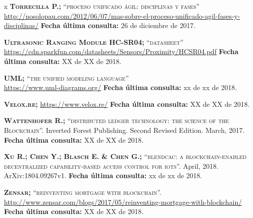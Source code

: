 \begin{thebibliography} {x}
	 \textsc{\textbf{Torrecilla P.; }}\textsc{“proceso unificado ágil: disciplinas y fases”} \\ 
	\url{http://nosolopau.com/2012/06/07/mas-sobre-el-proceso-unificado-agil-fases-y-disciplinas/}
	\newline \textbf{Fecha última consulta:} 26 de diciembre de 2017.
		
	 \textsc{\textbf{Ultrasonic Ranging Module HC-SR04; }}\textsc{“datasheet”} \\
	\url{https://cdn.sparkfun.com/datasheets/Sensors/Proximity/HCSR04.pdf}
	\newline \textbf{Fecha última consulta:} XX de XX de 2018.
				
	 \textsc{\textbf{UML; }}\textsc{“the unified modeling language”} \\ 
	\url{https://www.uml-diagrams.org/}
	\newline \textbf{Fecha última consulta:} xx de xx de 2018.	
		
	 \textsc{\textbf{Velox.re; }} 
	\url{https://www.velox.re/}
	\newline \textbf{Fecha última consulta:} XX de XX de 2018.
	
	 \textsc{\textbf{Wattenhofer R.; }}\textsc{“distributed ledger technology: the science of the Blockchain”.} Inverted Forest Publishing. Second Revised Edition. March, 2017.
	\newline \textbf{Fecha última consulta:} XX de XX de 2018.
	
	 \textsc{\textbf{Xu R.; Chen Y.; Blasch E. \& Chen G.; }} \textsc{“blendcac: a blockchain-enabled decentralized capability-based access control for iots”.} April, 2018. ArXiv:1804.09267v1.
	\newline \textbf{Fecha última consulta:} xx de xx de 2018.
	
	 \textsc{\textbf{Zensar; }} \textsc{“reinventing mortgage with blockchain”.}
	\url{http://www.zensar.com/blogs/2017/05/reinventing-mortgage-with-blockchain/}
	\newline \textbf{Fecha última consulta:} XX de XX de 2018.
						
						
																				


		 										
	\endgroup
\end{thebibliography}